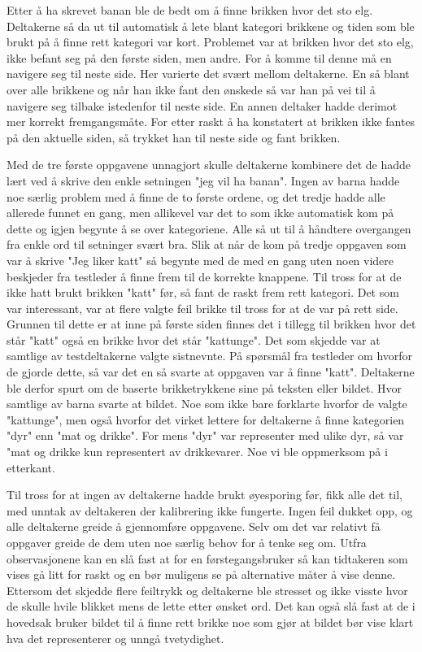  
Etter å ha skrevet banan ble de bedt om å finne brikken hvor det sto elg. Deltakerne så da ut til automatisk å lete blant kategori brikkene og tiden som ble brukt på å finne rett kategori var kort. Problemet var at brikken hvor det sto elg, ikke befant seg på den første siden, men andre. For å komme til denne må en navigere seg til neste side. Her varierte det svært mellom deltakerne. En så blant over alle brikkene og når han ikke fant den ønskede så var han på vei til å navigere seg tilbake istedenfor til neste side. En annen deltaker hadde derimot mer korrekt fremgangsmåte. For etter raskt å ha konstatert at brikken ikke fantes på den aktuelle siden, så trykket han til neste side og fant brikken.  
 
Med de tre første oppgavene unnagjort skulle deltakerne kombinere det de hadde lært ved å skrive den enkle setningen "jeg vil ha banan". Ingen av barna hadde noe særlig problem med å finne de to første ordene, og det tredje hadde alle allerede funnet en gang, men allikevel var det to som ikke automatisk kom på dette og igjen begynte å se over kategoriene. Alle så ut til å håndtere overgangen fra enkle ord til setninger svært bra. Slik at når de kom på tredje oppgaven som var å skrive "Jeg liker katt" så begynte med de med en gang uten noen videre beskjeder fra testleder å finne frem til de korrekte knappene. Til tross for at de ikke hatt brukt brikken "katt" før, så fant de raskt frem rett kategori. Det som var interessant, var at flere valgte feil brikke til tross for at de var på rett side. Grunnen til dette er at inne på første siden finnes det i tillegg til brikken hvor det står "katt" også en brikke hvor det står "kattunge". Det som skjedde var at samtlige av testdeltakerne valgte sistnevnte. På spørsmål fra testleder om hvorfor de gjorde dette, så var det en så svarte at oppgaven var å finne "katt". Deltakerne ble derfor spurt om de baserte brikketrykkene sine på teksten eller bildet. Hvor samtlige av barna svarte at bildet. Noe som ikke bare forklarte hvorfor de valgte "kattunge", men også hvorfor det virket lettere for deltakerne å finne kategorien "dyr" enn "mat og drikke". For mens "dyr" var representer med ulike dyr, så var "mat og drikke kun representert av drikkevarer. Noe vi ble oppmerksom på i etterkant. 
 
Til tross for at ingen av deltakerne hadde brukt øyesporing før, fikk alle det til, med unntak av deltakeren der kalibrering ikke fungerte. Ingen feil dukket opp, og alle deltakerne greide å gjennomføre oppgavene. Selv om det var relativt få oppgaver greide de dem uten noe særlig behov for å tenke seg om. Utfra observasjonene kan en slå fast at for en førstegangsbruker så kan tidtakeren som vises gå litt for raskt og en bør muligens se på alternative måter å vise denne. Ettersom det skjedde flere feiltrykk og deltakerne ble stresset og ikke visste hvor de skulle hvile blikket mens de lette etter ønsket ord. Det kan også slå fast at de i hovedsak bruker bildet til å finne rett brikke noe som gjør at bildet bør vise klart hva det representerer og unngå tvetydighet.  
 

